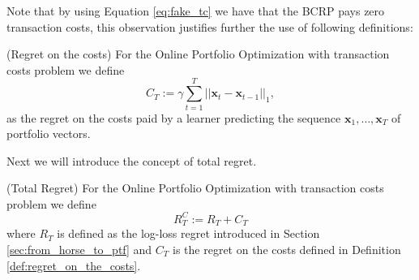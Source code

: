 Note that by using Equation \eqref{eq:fake_tc} we have that the BCRP pays zero transaction costs, this observation justifies further the use of following definitions:

\begin{definition}(Regret on the costs)\label{def:regret_on_the_costs}
For the Online Portfolio Optimization with transaction costs problem we define 
\begin{equation}
C_T:=\gamma\sum\limits_{t=1}^T||\mathbf x_t-\mathbf x_{t-1}||_1,
\end{equation}
as the regret on the costs paid by a learner predicting the sequence $\mathbf x_1,\ldots,\mathbf x_T$ of portfolio vectors.
\end{definition}

Next we will introduce the concept of total regret.

\begin{definition}(Total Regret)
For the Online Portfolio Optimization with transaction costs problem we define 
\begin{equation}
R_T^C:=R_T+C_T
\end{equation}
where $R_T$ is defined as the log-loss regret introduced in Section \ref{sec:from_horse_to_ptf} and $C_T$ is the regret on the costs defined in Definition \ref{def:regret_on_the_costs}.
\end{definition}



